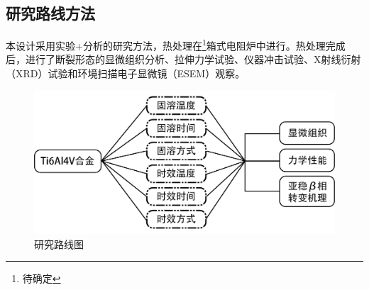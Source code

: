 \subsection{研究路线方法}
本设计采用实验+分析的研究方法，热处理在\footnote{待确定}箱式电阻炉中进行。热处理完成后，进行了断裂形态的显微组织分析、拉伸力学试验、仪器冲击试验、X射线衍射（XRD）试验和环境扫描电子显微镜（ESEM）观察。

\begin{figure}[h!]
	\centering
	\includegraphics[width=0.7\linewidth]{pic/路线图}
	\caption{研究路线图}
	\label{fig:roadmap}
\end{figure}
